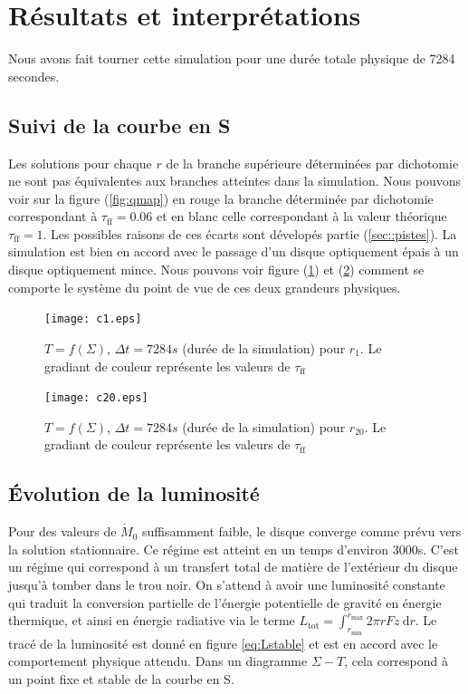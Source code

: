 \section{Résultats et interprétations}

Nous avons fait tourner cette simulation pour une durée totale physique de 7284 secondes.  

\subsection{Suivi de la courbe en S}
Les solutions pour chaque $r$ de la branche supérieure déterminées par dichotomie ne sont pas équivalentes aux branches atteintes dans la simulation. Nous pouvons voir sur la figure (\ref{fig:qmap}) en rouge la branche déterminée par dichotomie correspondant à $\tau_\mathrm{ff} = 0.06 $ et en blanc celle correspondant à la valeur théorique $\tau_\mathrm{ff} = 1$. Les possibles raisons de ces écarts sont dévelopés partie (\ref{sec::pistes}). La simulation est bien en accord avec le passage d'un disque optiquement épais à un disque optiquement mince. Nous pouvons voir figure (\ref{fig:c1.eps}) et (\ref{fig:c20.eps}) comment se comporte le système du point de vue de ces deux grandeurs physiques.  \\
 

\begin{figure}
  \begin{center}
    \texttt{[image: c1.eps]}
  \end{center}
  \caption{$T=f(\Sigma)$, $\Delta t = 7284 s$ (durée de la simulation) pour $r_{1}$. Le gradiant de couleur représente les valeurs de $\tau_\mathrm{ff}$}
  \label{fig:c1.eps}
\end{figure} 

\begin{figure}
  \begin{center}
    \texttt{[image: c20.eps]}
  \end{center}
  \caption{$T=f(\Sigma)$, $\Delta t = 7284 s$ (durée de la simulation) pour $r_{20}$. Le gradiant de couleur représente les valeurs de $\tau_\mathrm{ff}$}
  \label{fig:c20.eps}
\end{figure}

\subsection{Évolution de la luminosité}

Pour des valeurs de $\dot{M}_0$ suffisamment faible, le disque converge comme prévu vers la solution stationnaire. Ce régime est atteint en un temps d'environ 3000s. C'est un régime qui correspond à un transfert total de matière de l'extérieur du disque jusqu'à tomber dans le trou noir. On s'attend à avoir une luminosité constante qui traduit la conversion partielle de l'énergie potentielle de gravité en énergie thermique, et ainsi en énergie radiative via le terme $L_\mathrm{tot} = \int_{r_\mathrm{min}}^{r_\mathrm{max}} 2\pi r Fz\ \mathrm{d}r$. Le tracé de la luminosité est donné en figure \ref{eq:Lstable} et est en accord avec le comportement physique attendu. Dans un diagramme $\Sigma-T$, cela correspond à un point fixe et stable de la courbe en S.

